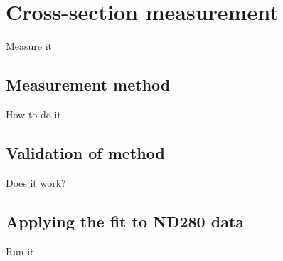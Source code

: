 


\chapter{Cross-section measurement}
\label{chap:CrossSectionMeasurement}
Measure it

\section{Measurement method}
\label{sec:MeasurementMethod}
How to do it

\section{Validation of method}
\label{sec:MethodValidation}
Does it work?

\section{Applying the fit to ND280 data}
\label{sec:ND280DataFit}
Run it


